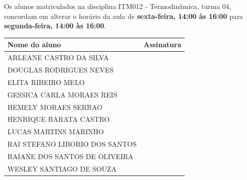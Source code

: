 \documentclass[12pt,a4paper,brazilian, fleqn]{article}
\begin{document}
Os alunos matriculados na disciplina ITM012 - Termodinâmica, turma 04,
concordam em alterar o horário da aula de \textbf{sexta-feira, 14:00 às 16:00}
para \textbf{segunda-feira, 14:00 às 16:00}.

\vspace{1cm}
\begin{tabular}{m{7.5cm}m{9.5cm}}
    Nome do aluno & Assinatura \\ \hline
    ARLEANE CASTRO DA SILVA & \rule{0pt}{1.5cm} \\ \hline
    DOUGLAS RODRIGUES NEVES & \rule{0pt}{1.5cm} \\ \hline
    ELITA RIBEIRO MELO & \rule{0pt}{1.5cm} \\ \hline
    GESSICA CARLA MORAES REIS & \rule{0pt}{1.5cm} \\ \hline
    HEMELY MORAES SERRAO & \rule{0pt}{1.5cm} \\ \hline
    HENRIQUE BARATA CASTRO & \rule{0pt}{1.5cm} \\ \hline
    LUCAS MARTINS MARINHO & \rule{0pt}{1.5cm} \\ \hline
    RAI STEFANO LIBORIO DOS SANTOS & \rule{0pt}{1.5cm} \\ \hline
    RAIANE DOS SANTOS DE OLIVEIRA & \rule{0pt}{1.5cm} \\ \hline
    WESLEY SANTIAGO DE SOUZA & \rule{0pt}{1.5cm} \\ \hline
\end{tabular}
\end{document}
